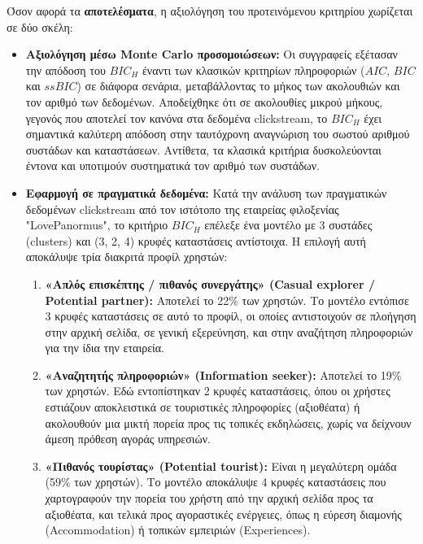 \documentclass[12pt,a4paper]{article}
\begin{document}
	Όσον αφορά τα \textbf{αποτελέσματα}, η αξιολόγηση του προτεινόμενου κριτηρίου χωρίζεται σε δύο σκέλη:
	
	\begin{itemize}
		\item \textbf{Αξιολόγηση μέσω Monte Carlo προσομοιώσεων:} Οι συγγραφείς εξέτασαν την απόδοση του $BIC_H$ έναντι των κλασικών κριτηρίων πληροφοριών ($AIC$, $BIC$ και $ssBIC$) σε διάφορα σενάρια, μεταβάλλοντας το μήκος των ακολουθιών και τον αριθμό των δεδομένων. Αποδείχθηκε ότι σε ακολουθίες μικρού μήκους, γεγονός που αποτελεί τον κανόνα στα δεδομένα clickstream, το $BIC_H$ έχει σημαντικά καλύτερη απόδοση στην ταυτόχρονη αναγνώριση του σωστού αριθμού συστάδων και καταστάσεων. Αντίθετα, τα κλασικά κριτήρια δυσκολεύονται έντονα και υποτιμούν συστηματικά τον αριθμό των συστάδων.
		
		\item \textbf{Εφαρμογή σε πραγματικά δεδομένα:} Κατά την ανάλυση των πραγματικών δεδομένων clickstream από τον ιστότοπο της εταιρείας φιλοξενίας "LovePanormus", το κριτήριο $BIC_H$ επέλεξε ένα μοντέλο με 3 συστάδες (clusters) και (3, 2, 4) κρυφές καταστάσεις αντίστοιχα. Η επιλογή αυτή αποκάλυψε τρία διακριτά προφίλ χρηστών:
		\begin{enumerate}
			\item \textbf{ «Απλός επισκέπτης / πιθανός συνεργάτης» (Casual explorer / Potential partner):} Αποτελεί το 22\% των χρηστών. Το μοντέλο εντόπισε 3 κρυφές καταστάσεις σε αυτό το προφίλ, οι οποίες αντιστοιχούν σε πλοήγηση στην αρχική σελίδα, σε γενική εξερεύνηση, και στην αναζήτηση πληροφοριών για την ίδια την εταιρεία.
			
			\item \textbf{«Αναζητητής πληροφοριών» (Information seeker):} Αποτελεί το 19\% των χρηστών. Εδώ εντοπίστηκαν 2 κρυφές καταστάσεις, όπου οι χρήστες εστιάζουν αποκλειστικά σε τουριστικές πληροφορίες (αξιοθέατα) ή ακολουθούν μια μικτή πορεία προς τις τοπικές εκδηλώσεις, χωρίς να δείχνουν άμεση πρόθεση αγοράς υπηρεσιών.
			
			\item \textbf{«Πιθανός τουρίστας» (Potential tourist):} Είναι η μεγαλύτερη ομάδα (59\% των χρηστών). Το μοντέλο αποκάλυψε 4 κρυφές καταστάσεις που χαρτογραφούν την πορεία του χρήστη από την αρχική σελίδα προς τα αξιοθέατα, και τελικά προς αγοραστικές ενέργειες, όπως η εύρεση διαμονής (Accommodation) ή τοπικών εμπειριών (Experiences).
		\end{enumerate}
	\end{itemize}
	
\end{document}
